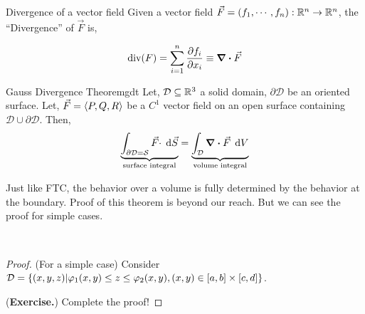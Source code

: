 \documentclass[../Analysis-3]{subfiles}
\begin{document}
\begin{Def}{Divergence of a vector field}{}
    \small  Given a vector field $\vec{F} = (f_1,\cdots, f_n) : \mathbb{R}^n \to \mathbb{R}^n $, the ``Divergence'' of $\vec{F}$ is,

    \[\text{div}(F) = \sum_{i=1}^{n} \pdv{f_i}{x_i} \equiv \div \vec{F}\]
\end{Def}

\begin{Thm}{Gauss Divergence Theorem}{gdt}
    Let, $\mathcal{D} \subseteq \mathbb{R}^3$ a solid domain, $\partial{\mathcal{D}}$ be an oriented surface. Let,  $\vec{F} = \left\langle {P}, {Q,R} \right\rangle$ be a $C^1$ vector field on an open surface containing $\mathcal{D} \cup \partial{\mathcal{D}}$. Then,
    \[
        \underbrace{\int_{\partial{\mathcal{D}} = \mathcal{S}} {\vec{F}\cdot} \hspace{0.1cm} \dd {\vec{S}}}_\text{surface integral} = \underbrace{\int_{\mathcal{D}} {\div \vec{F}} \hspace{0.1cm} \dd {V}}_\text{volume integral}
    \]
\end{Thm}

Just like FTC, the behavior over a volume is fully determined by the behavior at the boundary. Proof of this theorem is beyond our reach. But we can see the proof for simple cases.

\

\begin{proof}
    (For a simple case) Consider $\mathcal{D} = \qty{(x,y,z) | \varphi_1(x,y) \le z \le \varphi_2(x,y), (x,y) \in [a,b]\times [c,d]}$.

    (\textbf{Exercise.}) Complete the proof!
\end{proof}
\end{document}
